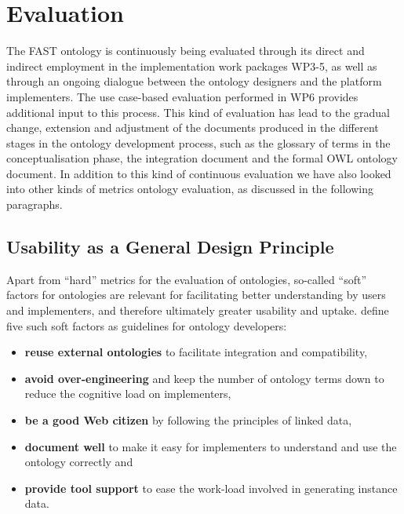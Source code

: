 \documentclass[twoside]{fast_latex}
\begin{document}

\section{Evaluation} %
\label{sec:evaluation}

The FAST ontology is continuously being evaluated through its direct and indirect employment in the implementation work packages WP3-5, as well as through an ongoing dialogue between the ontology designers and the platform implementers. The use case-based evaluation performed in WP6 provides additional input to this process. 
This kind of evaluation has lead to the gradual change, extension and adjustment of the documents produced in the different stages in the ontology development process, such as the glossary of terms in the conceptualisation phase, the integration document and the formal OWL ontology document. In addition to this kind of continuous evaluation we have also looked into other kinds of metrics ontology evaluation, as discussed in the following paragraphs.


\subsection{Usability as a General Design Principle} %
\label{sub:general_design_decisions}

Apart from ``hard'' metrics for the evaluation of ontologies, so-called ``soft'' factors for ontologies are relevant for facilitating better understanding by users and implementers, and therefore ultimately greater usability and uptake. \cite{moeller2009ontology_soft_skills} define five such soft factors as guidelines for ontology developers:

\singlespacing
\begin{itemize}
	\item \textbf{reuse external ontologies} to facilitate integration and compatibility,
	\item \textbf{avoid over-engineering} and keep the number of ontology terms down to reduce the cognitive load on implementers,
	\item \textbf{be a good Web citizen} by following the principles of linked data,
	\item \textbf{document well} to make it easy for implementers to understand and use the ontology correctly and
	\item \textbf{provide tool support} to ease the work-load involved in generating instance data.
\end{itemize}
\doublespacing
\end{document}
